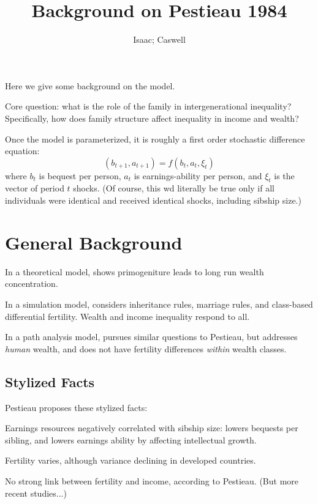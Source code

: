 \documentclass{article}
\begin{document}
\author{Isaac; Caswell}
\title{Background on Pestieau 1984}
\maketitle

Here we give some background on the \citet{pestieau-1984-oep} model.

Core question: what is the role of the family in intergenerational inequality?
Specifically, how does family structure affect inequality in income and wealth?

Once the model is parameterized,
it is roughly a first order stochastic difference equation:
\begin{equation}
(b_{t+1}, a_{t+1}) = f(b_{t}, a_{t}, \xi_{t})
\end{equation}
where
$b_{t}$ is bequest per person,
$a_{t}$ is earnings-ability per person,
and
$\xi_{t}$ is the vector of period $t$ shocks.
(Of course, this wd literally be true only if all
individuals were identical and received identical shocks,
including sibship size.)


\section{General Background}

In a theoretical model,
\citet{stiglitz-1969-e} shows primogeniture leads to long run wealth concentration.

In a simulation model,
\citet{pryor-1973-aer} considers inheritance rules, marriage rules,
and class-based differential fertility.
Wealth and income inequality respond to all.

In a path analysis model,
\citet{clague-1977-jhr} pursues similar questions to Pestieau,
but addresses \emph{human} wealth,
and does not have fertility differences \emph{within} wealth classes.


\subsection{Stylized Facts}

Pestieau proposes these stylized facts:

Earnings resources negatively correlated with sibship size:
lowers bequests per sibling,
and lowers earnings ability by affecting intellectual growth.

Fertility varies, although variance declining in developed countries.


No strong link between fertility and income, according to Pestieau.
(But more recent studies...)
\end{document}
